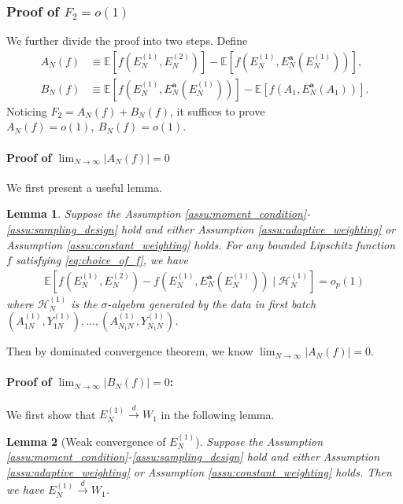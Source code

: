 \documentclass[12pt]{article}
\newtheorem{lemma}{Lemma}
\newcommand{\E}{\mathbb E}								%
\newcommand{\convd}{\overset d \rightarrow}             %
\begin{document}
\subsubsection{Proof of $F_2=o(1)$}

We further divide the proof into two steps. Define 
\begin{align*}
	A_N(f)
	&
	\equiv \E[f(E_{N}^{(1)},E_{N}^{(2)})]-\E[f(E_N^{(1)},E_N^{\textbf{a}}(E_N^{(1)}))],\\ 
	B_N(f)
	&
	\equiv \E[f(E_N^{(1)},E_N^{\textbf{a}}(E_N^{(1)}))]-\E[f(A_1,E_N^{\textbf{a}}(A_1))].
\end{align*}
Noticing $F_2=A_N(f)+B_N(f)$, it suffices to prove $A_N(f)=o(1),\ B_N(f)=o(1)$. 

\paragraph{Proof of $\lim_{N\rightarrow\infty}|A_N(f)|=0$}

We first present a useful lemma.
\begin{lemma}\label{lem:A_N_f_convergence}
	Suppose the Assumption \ref{assu:moment_condition}-\ref{assu:sampling_design} hold and either Assumption \ref{assu:adaptive_weighting} or Assumption \ref{assu:constant_weighting} holds. For any bounded Lipschitz function $f$ satisfying \eqref{eq:choice_of_f}, we have 
	\begin{align*}
		\E\left[f(E_{N}^{(1)},E_{N}^{(2)})-f(E_{N}^{(1)},E_N^{\textbf{a}}(E_N^{(1)}))\mid \mathcal{H}^{(1)}_{N}\right]=o_p(1)
	\end{align*}
	where  $\mathcal{H}^{(1)}_{N}$ is the $\sigma$-algebra generated by the data in first batch $(A^{(1)}_{1N},Y^{(1)}_{1N}),\ldots, (A^{(1)}_{N_1N},Y^{(1)}_{N_1N})$.
\end{lemma}
\noindent Then by dominated convergence theorem, we know $\lim_{N\rightarrow\infty}|A_N(f)|=0$.

\paragraph{Proof of $\lim_{N\rightarrow\infty}|B_N(f)|=0$:}

We first show that $E_N^{(1)}\convd W_1$ in the following lemma.

\begin{lemma}[Weak convergence of $E_N^{(1)}$]\label{lem:weak_convergence_E_N_1}
	Suppose the Assumption \ref{assu:moment_condition}-\ref{assu:sampling_design} hold and either Assumption \ref{assu:adaptive_weighting} or Assumption \ref{assu:constant_weighting} holds. Then we have $E_N^{(1)}\convd W_1$.
\end{lemma}
\end{document}
